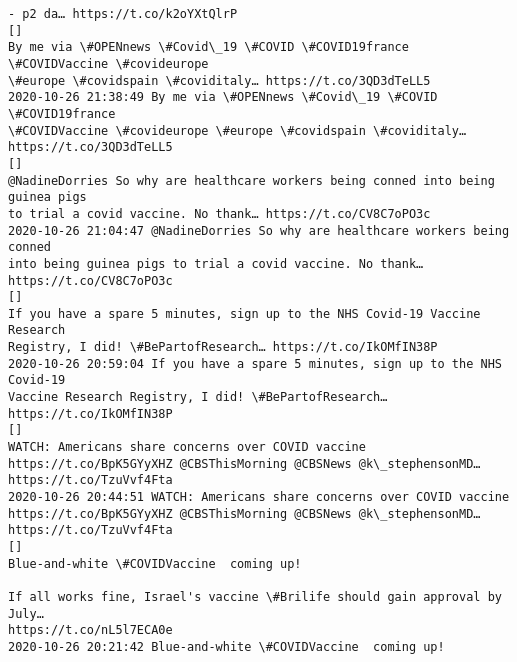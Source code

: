 \documentclass[11pt]{article}
\begin{document}
\begin{Verbatim}[commandchars=\\\{\}]
- p2 da… https://t.co/k2oYXtQlrP
[]
By me via \#OPENnews \#Covid\_19 \#COVID \#COVID19france \#COVIDVaccine \#covideurope
\#europe \#covidspain \#coviditaly… https://t.co/3QD3dTeLL5
2020-10-26 21:38:49 By me via \#OPENnews \#Covid\_19 \#COVID \#COVID19france
\#COVIDVaccine \#covideurope \#europe \#covidspain \#coviditaly…
https://t.co/3QD3dTeLL5
[]
@NadineDorries So why are healthcare workers being conned into being guinea pigs
to trial a covid vaccine. No thank… https://t.co/CV8C7oPO3c
2020-10-26 21:04:47 @NadineDorries So why are healthcare workers being conned
into being guinea pigs to trial a covid vaccine. No thank…
https://t.co/CV8C7oPO3c
[]
If you have a spare 5 minutes, sign up to the NHS Covid-19 Vaccine Research
Registry, I did! \#BePartofResearch… https://t.co/IkOMfIN38P
2020-10-26 20:59:04 If you have a spare 5 minutes, sign up to the NHS Covid-19
Vaccine Research Registry, I did! \#BePartofResearch… https://t.co/IkOMfIN38P
[]
WATCH: Americans share concerns over COVID vaccine
https://t.co/BpK5GYyXHZ @CBSThisMorning @CBSNews @k\_stephensonMD…
https://t.co/TzuVvf4Fta
2020-10-26 20:44:51 WATCH: Americans share concerns over COVID vaccine
https://t.co/BpK5GYyXHZ @CBSThisMorning @CBSNews @k\_stephensonMD…
https://t.co/TzuVvf4Fta
[]
Blue-and-white \#COVIDVaccine  coming up!

If all works fine, Israel's vaccine \#Brilife should gain approval by July…
https://t.co/nL5l7ECA0e
2020-10-26 20:21:42 Blue-and-white \#COVIDVaccine  coming up!


\end{Verbatim}
\end{document}
